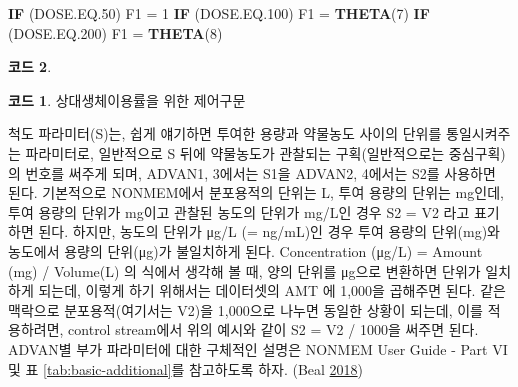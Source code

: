 \documentclass[
  10pt,
  krantz2,
  a4paper]{krantz}
\newenvironment{Shaded}{\begin{snugshade}}{\end{snugshade}}
\newcommand{\DecValTok}[1]{\textcolor[rgb]{0.00,0.00,0.81}{#1}}
\newcommand{\FloatTok}[1]{\textcolor[rgb]{0.00,0.00,0.81}{#1}}
\newcommand{\KeywordTok}[1]{\textcolor[rgb]{0.13,0.29,0.53}{\textbf{#1}}}
\newcommand{\NormalTok}[1]{#1}
\newcommand{\StringTok}[1]{\textcolor[rgb]{0.31,0.60,0.02}{#1}}
\theoremstyle{definition}
\theoremstyle{definition}
\newtheorem{example}{코드}[chapter]
\theoremstyle{definition}
\theoremstyle{remark}
\begin{document}
\begin{Shaded}
\begin{Highlighting}[]
\KeywordTok{IF}\NormalTok{ (DOSE.EQ}\FloatTok{.50}\NormalTok{) F1 =}\StringTok{ }\DecValTok{1}
\KeywordTok{IF}\NormalTok{ (DOSE.EQ}\FloatTok{.100}\NormalTok{) F1 =}\StringTok{ }\KeywordTok{THETA}\NormalTok{(}\DecValTok{7}\NormalTok{)}
\KeywordTok{IF}\NormalTok{ (DOSE.EQ}\FloatTok{.200}\NormalTok{) F1 =}\StringTok{ }\KeywordTok{THETA}\NormalTok{(}\DecValTok{8}\NormalTok{)}
\end{Highlighting}
\end{Shaded}

\begin{example}
\begin{example}

\protect\hypertarget{exm:code-if}{}{\label{exm:code-if} }상대생체이용률을 위한 제어구문

\end{example}
\end{example}

척도 파라미터(S)는, 쉽게 얘기하면 투여한 용량과 약물농도 사이의 단위를 통일시켜주는 파라미터로, 일반적으로 S 뒤에 약물농도가 관찰되는 구획(일반적으로는 중심구획)의 번호를 써주게 되며, ADVAN1, 3에서는 S1을 ADVAN2, 4에서는 S2를 사용하면 된다. 기본적으로 NONMEM에서 분포용적의 단위는 L, 투여 용량의 단위는 mg인데, 투여 용량의 단위가 mg이고 관찰된 농도의 단위가 mg/L인 경우 S2 = V2 라고 표기하면 된다. 하지만, 농도의 단위가 μg/L (= ng/mL)인 경우 투여 용량의 단위(mg)와 농도에서 용량의 단위(μg)가 불일치하게 된다. Concentration (μg/L) = Amount (mg) / Volume(L) 의 식에서 생각해 볼 때, 양의 단위를 μg으로 변환하면 단위가 일치하게 되는데, 이렇게 하기 위해서는 데이터셋의 AMT 에 1,000을 곱해주면 된다. 같은 맥락으로 분포용적(여기서는 V2)을 1,000으로 나누면 동일한 상황이 되는데, 이를 적용하려면, control stream에서 위의 예시와 같이 S2 = V2 / 1000을 써주면 된다. ADVAN별 부가 파라미터에 대한 구체적인 설명은 NONMEM User Guide - Part VI 및 표 \ref{tab:basic-additional}를 참고하도록 하자. (Beal \protect\hyperlink{ref-nonmem}{2018})
\end{document}
